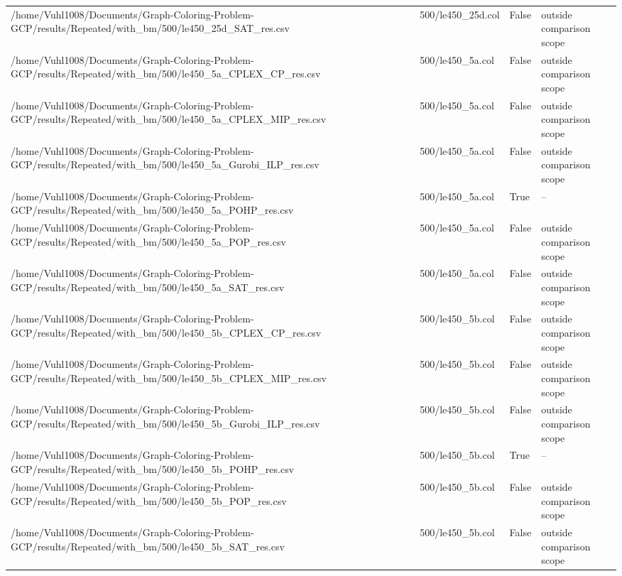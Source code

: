 \begin{table}[htbp]
\begin{tabular}{llll}
/home/Vuhl1008/Documents/Graph-Coloring-Problem-GCP/results/Repeated/with\_bm/500/le450\_25d\_SAT\_res.csv & 500/le450\_25d.col & False & outside comparison scope \\
/home/Vuhl1008/Documents/Graph-Coloring-Problem-GCP/results/Repeated/with\_bm/500/le450\_5a\_CPLEX\_CP\_res.csv & 500/le450\_5a.col & False & outside comparison scope \\
/home/Vuhl1008/Documents/Graph-Coloring-Problem-GCP/results/Repeated/with\_bm/500/le450\_5a\_CPLEX\_MIP\_res.csv & 500/le450\_5a.col & False & outside comparison scope \\
/home/Vuhl1008/Documents/Graph-Coloring-Problem-GCP/results/Repeated/with\_bm/500/le450\_5a\_Gurobi\_ILP\_res.csv & 500/le450\_5a.col & False & outside comparison scope \\
/home/Vuhl1008/Documents/Graph-Coloring-Problem-GCP/results/Repeated/with\_bm/500/le450\_5a\_POHP\_res.csv & 500/le450\_5a.col & True & -- \\
/home/Vuhl1008/Documents/Graph-Coloring-Problem-GCP/results/Repeated/with\_bm/500/le450\_5a\_POP\_res.csv & 500/le450\_5a.col & False & outside comparison scope \\
/home/Vuhl1008/Documents/Graph-Coloring-Problem-GCP/results/Repeated/with\_bm/500/le450\_5a\_SAT\_res.csv & 500/le450\_5a.col & False & outside comparison scope \\
/home/Vuhl1008/Documents/Graph-Coloring-Problem-GCP/results/Repeated/with\_bm/500/le450\_5b\_CPLEX\_CP\_res.csv & 500/le450\_5b.col & False & outside comparison scope \\
/home/Vuhl1008/Documents/Graph-Coloring-Problem-GCP/results/Repeated/with\_bm/500/le450\_5b\_CPLEX\_MIP\_res.csv & 500/le450\_5b.col & False & outside comparison scope \\
/home/Vuhl1008/Documents/Graph-Coloring-Problem-GCP/results/Repeated/with\_bm/500/le450\_5b\_Gurobi\_ILP\_res.csv & 500/le450\_5b.col & False & outside comparison scope \\
/home/Vuhl1008/Documents/Graph-Coloring-Problem-GCP/results/Repeated/with\_bm/500/le450\_5b\_POHP\_res.csv & 500/le450\_5b.col & True & -- \\
/home/Vuhl1008/Documents/Graph-Coloring-Problem-GCP/results/Repeated/with\_bm/500/le450\_5b\_POP\_res.csv & 500/le450\_5b.col & False & outside comparison scope \\
/home/Vuhl1008/Documents/Graph-Coloring-Problem-GCP/results/Repeated/with\_bm/500/le450\_5b\_SAT\_res.csv & 500/le450\_5b.col & False & outside comparison scope \\

\end{tabular}
\end{table}

